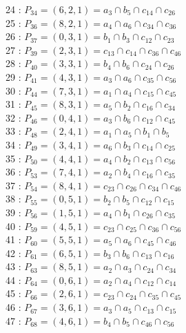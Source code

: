 \documentclass{article}
\begin{document}
{24 : $P_{34}=( 6, 2, 1 ) = a_{3} \cap b_{5} \cap c_{14} \cap c_{26}$\\
25 : $P_{36}=( 8, 2, 1 ) = a_{4} \cap a_{6} \cap c_{34} \cap c_{36}$\\
26 : $P_{37}=( 0, 3, 1 ) = b_{1} \cap b_{3} \cap c_{12} \cap c_{23}$\\
27 : $P_{39}=( 2, 3, 1 ) = c_{13} \cap c_{14} \cap c_{36} \cap c_{46}$\\
28 : $P_{40}=( 3, 3, 1 ) = b_{4} \cap b_{6} \cap c_{24} \cap c_{26}$\\
29 : $P_{41}=( 4, 3, 1 ) = a_{3} \cap a_{6} \cap c_{35} \cap c_{56}$\\
30 : $P_{44}=( 7, 3, 1 ) = a_{1} \cap a_{4} \cap c_{15} \cap c_{45}$\\
31 : $P_{45}=( 8, 3, 1 ) = a_{5} \cap b_{2} \cap c_{16} \cap c_{34}$\\
32 : $P_{46}=( 0, 4, 1 ) = a_{3} \cap b_{6} \cap c_{12} \cap c_{45}$\\
33 : $P_{48}=( 2, 4, 1 ) = a_{1} \cap a_{5} \cap b_{1} \cap b_{5}$\\
34 : $P_{49}=( 3, 4, 1 ) = a_{6} \cap b_{3} \cap c_{14} \cap c_{25}$\\
35 : $P_{50}=( 4, 4, 1 ) = a_{4} \cap b_{2} \cap c_{13} \cap c_{56}$\\
36 : $P_{53}=( 7, 4, 1 ) = a_{2} \cap b_{4} \cap c_{16} \cap c_{35}$\\
37 : $P_{54}=( 8, 4, 1 ) = c_{23} \cap c_{26} \cap c_{34} \cap c_{46}$\\
38 : $P_{55}=( 0, 5, 1 ) = b_{2} \cap b_{5} \cap c_{12} \cap c_{15}$\\
39 : $P_{56}=( 1, 5, 1 ) = a_{4} \cap b_{1} \cap c_{26} \cap c_{35}$\\
40 : $P_{59}=( 4, 5, 1 ) = c_{23} \cap c_{25} \cap c_{36} \cap c_{56}$\\
41 : $P_{60}=( 5, 5, 1 ) = a_{5} \cap a_{6} \cap c_{45} \cap c_{46}$\\
42 : $P_{61}=( 6, 5, 1 ) = b_{3} \cap b_{6} \cap c_{13} \cap c_{16}$\\
43 : $P_{63}=( 8, 5, 1 ) = a_{2} \cap a_{3} \cap c_{24} \cap c_{34}$\\
44 : $P_{64}=( 0, 6, 1 ) = a_{2} \cap a_{4} \cap c_{12} \cap c_{14}$\\
45 : $P_{66}=( 2, 6, 1 ) = c_{23} \cap c_{24} \cap c_{35} \cap c_{45}$\\
46 : $P_{67}=( 3, 6, 1 ) = a_{3} \cap a_{5} \cap c_{13} \cap c_{15}$\\
47 : $P_{68}=( 4, 6, 1 ) = b_{4} \cap b_{5} \cap c_{46} \cap c_{56}$\\
}
\end{document}
